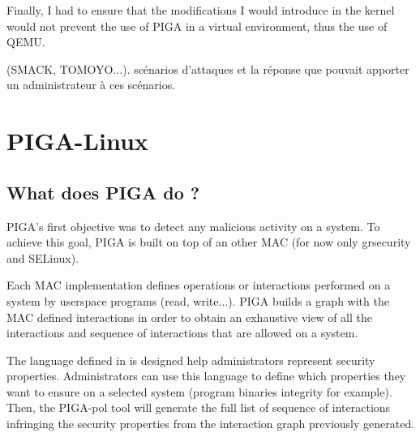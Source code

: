 \documentclass[pdftex,a4paper,titlepage,11pt]{article}
\begin{document}
\bigskip

Finally, I had to ensure that the modifications I would introduce in the kernel
would not prevent the use of PIGA in a virtual environment, thus the use of
QEMU.


(SMACK, TOMOYO...).
scénarios d'attaques et la réponse que pouvait apporter un administrateur à ces
scénarios.

\newpage

\section{PIGA-Linux}

\subsection{What does PIGA do ?}

PIGA's first objective was to detect any malicious activity on a system. To
achieve this goal, PIGA is built on top of an other MAC (for now only grsecurity
and SELinux).

\bigskip

Each MAC implementation defines operations or interactions performed on a system
by userspace programs (read, write...). PIGA  builds a graph with the MAC
defined interactions in order to obtain an exhaustive view of all the
interactions and sequence of interactions that are allowed on a system.

\bigskip

The language defined in \cite{THESEBRIFFAUT} is designed help administrators
represent security properties. Administrators can use this language to define
which properties they want to ensure on a selected system (program binaries
integrity for example). Then, the PIGA-pol tool will generate the full list of
sequence of interactions infringing the security properties from the interaction
graph previously generated.
\end{document}
